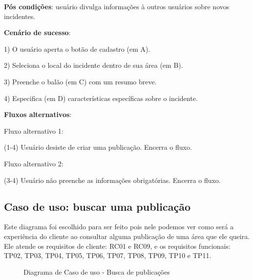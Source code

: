 \documentclass[12pt]{article}
\begin{document}
\textbf{Pós condições}: usuário divulga informações à outros usuários sobre novos incidentes.

\textbf{Cenário de sucesso}:

1) O usuário aperta o botão de cadastro (em A).

2) Seleciona o local do incidente dentro de sua área (em B).

3) Preenche o balão (em C) com um resumo breve.

4) Especifica (em D) características específicas sobre o incidente.

\textbf{Fluxos alternativos}:

Fluxo alternativo 1:

(1-4) Usuário desiste de criar uma publicação. Encerra o fluxo.

Fluxo alternativo 2:

(3-4) Usuário não preenche as informações obrigatórias. Encerra o fluxo.

\vfill%
\pagebreak%

\subsection{Caso de uso: buscar uma publicação}
Este diagrama foi escolhido para ser feito pois nele podemos ver como será a experiência do cliente ao consultar alguma publicação de uma área que ele queira. Ele atende os requisitos de cliente: RC01 e RC09, e os requisitos funcionais: TP02, TP03, TP04, TP05, TP06, TP07, TP08, TP09, TP10 e TP11.

  \begin{figure}[!htb]
    \caption{\label{fig:diagUseCase05} Diagrama de Caso de uso - Busca de publicações}
  \end{figure}
\end{document}
